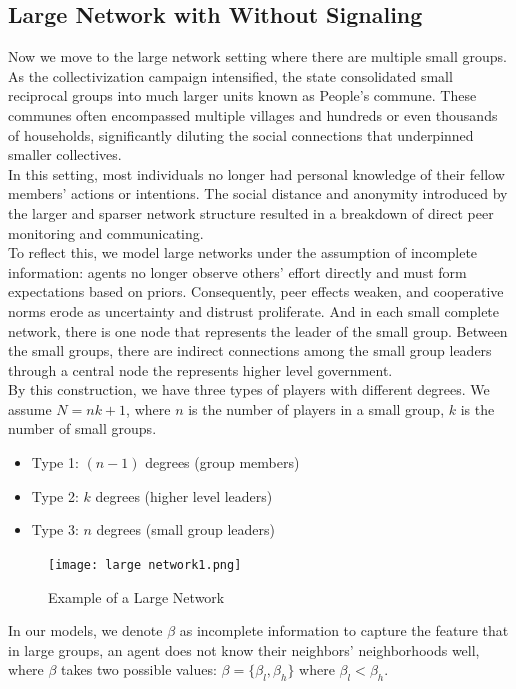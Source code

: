 \documentclass[12pt]{article}
\begin{document}
\subsection{Large Network with Without Signaling}
Now we move to the large network setting where there are multiple small groups. As the collectivization campaign intensified, the state consolidated small reciprocal groups into much larger units known as People’s commune. These communes often encompassed multiple villages and hundreds or even thousands of households, significantly diluting the social connections that underpinned smaller collectives.\\
In this setting, most individuals no longer had personal knowledge of their fellow members’ actions or intentions. The social distance and anonymity introduced by the larger and sparser network structure resulted in a breakdown of direct peer monitoring and communicating. \\
To reflect this, we model large networks under the assumption of incomplete information: agents no longer observe others' effort directly and must form expectations based on priors. Consequently, peer effects weaken, and cooperative norms erode as uncertainty and distrust proliferate. And in each small complete network, there is one node that represents the leader of the small group. Between the small groups, there are indirect connections among the small group leaders through a central node the represents higher level government.\\
By this construction, we have three types of players with different degrees.  
We assume $N = nk + 1$, where $n$ is the number of players in a small group, $k$ is the number of small groups.

\begin{itemize}
    \item Type 1: $(n-1)$ degrees (group members)
    \item Type 2: $k$ degrees (higher level leaders)
    \item Type 3: $n$ degrees (small group leaders)
\end{itemize}

\begin{figure}[H]
  \centering
  \texttt{[image: large network1.png]}
  \caption{Example of a Large Network}
  \label{fig:large-network}
\end{figure}

In our models, we denote $\beta$ as incomplete information to capture the feature that in large groups, an agent does not know their neighbors' neighborhoods well, where $\beta$ takes two possible values: $\beta = \{\beta_l,\beta_h\}$ where $\beta_l < \beta_h$. 
\end{document}
